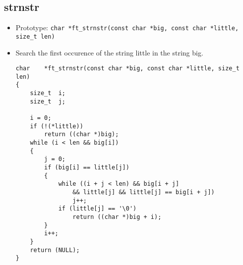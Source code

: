 \documentclass{article}
\begin{document}
		\subsection{strnstr}
			\begin{itemize}[label=$\rightarrow$]
				\item Prototype: \texttt{char    *ft\_strnstr(const char *big, const char *little, size\_t len)}
				\item Search the first occurence of the string little in the string big.
				\begin{verbatim}
char    *ft_strnstr(const char *big, const char *little, size_t len)            
{                                                                               
    size_t  i;                                                                  
    size_t  j;                                                                  
                                                                                
    i = 0;                                                                      
    if (!(*little))                                                             
        return ((char *)big);                                                   
    while (i < len && big[i])                                                   
    {                                                                           
        j = 0;                                                                  
        if (big[i] == little[j])                                                
        {                                                                       
            while ((i + j < len) && big[i + j]                                  
                && little[j] && little[j] == big[i + j])                        
                j++;                                                            
            if (little[j] == '\0')                                              
                return ((char *)big + i);                                       
        }                                                                       
        i++;                                                                    
    }                                                                           
    return (NULL);                                                              
}   
				\end{verbatim}
			\end{itemize}
	
\end{document}
